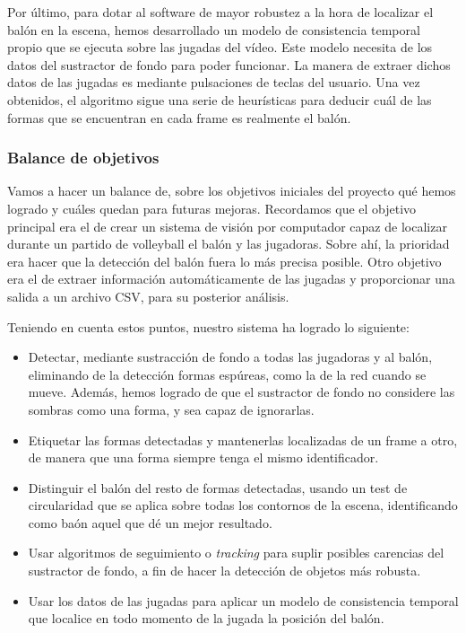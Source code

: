 Por último, para dotar al software de mayor robustez a la hora de localizar el balón en la escena, hemos desarrollado un modelo de consistencia temporal propio que se ejecuta sobre las jugadas del vídeo. Este modelo necesita de los datos del sustractor de fondo para poder funcionar. La manera de extraer dichos datos de las jugadas es mediante pulsaciones de teclas del usuario. Una vez obtenidos, el algoritmo sigue una serie de heurísticas para deducir cuál de las formas que se encuentran en cada frame es realmente el balón.

\subsubsection*{Balance de objetivos}
Vamos a hacer un balance de, sobre los objetivos iniciales del proyecto qué hemos logrado y cuáles quedan para futuras mejoras. Recordamos que el objetivo principal era el de crear un sistema de visión por computador capaz de localizar durante un partido de volleyball el balón y las jugadoras. Sobre ahí, la prioridad era hacer que la detección del balón fuera lo más precisa posible. Otro objetivo era el de extraer información automáticamente de las jugadas y proporcionar una salida a un archivo CSV, para su posterior análisis.

Teniendo en cuenta estos puntos, nuestro sistema ha logrado lo siguiente:
\begin{itemize}
    \item Detectar, mediante sustracción de fondo a todas las jugadoras y al balón, eliminando de la detección formas espúreas, como la de la red cuando se mueve. Además, hemos logrado de que el sustractor de fondo no considere las sombras como una forma, y sea capaz de ignorarlas.
    \item Etiquetar las formas detectadas y mantenerlas localizadas de un frame a otro, de manera que una forma siempre tenga el mismo identificador.
    \item Distinguir el balón del resto de formas detectadas, usando un test de circularidad que se aplica sobre todas los contornos de la escena, identificando como baón aquel que dé un mejor resultado.
    \item Usar algoritmos de seguimiento o \textit{tracking} para suplir posibles carencias del sustractor de fondo, a fin de hacer la detección de objetos más robusta.
    \item Usar los datos de las jugadas para aplicar un modelo de consistencia temporal que localice en todo momento de la jugada la posición del balón.
\end{itemize}

